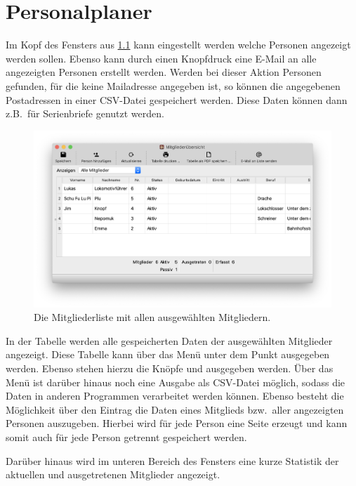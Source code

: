 \chapter{Personalplaner}\label{personal:mitglieder}
Im Kopf des Fensters aus \cref{fig:personal:mitglieder} kann eingestellt werden welche Personen angezeigt werden sollen.
Ebenso kann durch einen Knopfdruck eine E-Mail an alle angezeigten Personen erstellt werden.
Werden bei dieser Aktion Personen gefunden, für die keine Mailadresse angegeben ist,
so können die angegebenen Postadressen in einer CSV-Datei gespeichert werden.
Diese Daten können dann z.B.\ für Serienbriefe genutzt werden.


\begin{figure}[!h]
	\includegraphics[width=\textwidth]{img/personal-liste}
	\caption{Die Mitgliederliste mit allen ausgewählten Mitgliedern.}
	\label{fig:personal:mitglieder}
\end{figure}

In der Tabelle werden alle gespeicherten Daten der ausgewählten Mitglieder angezeigt.
Diese Tabelle kann über das Menü  unter dem Punkt  ausgegeben werden.
Ebenso stehen hierzu die Knöpfe  und  ausgegeben werden.
Über das Menü ist darüber hinaus noch eine Ausgabe als CSV-Datei möglich,
sodass die Daten in anderen Programmen verarbeitet werden können.
Ebenso besteht die Möglichkeit über den Eintrag  die Daten eines Mitglieds bzw.\ aller angezeigten Personen auszugeben.
Hierbei wird für jede Person eine Seite erzeugt und kann somit auch für jede Person getrennt gespeichert werden.

Darüber hinaus wird im unteren Bereich des Fensters eine kurze Statistik
der aktuellen und ausgetretenen Mitglieder angezeigt.
